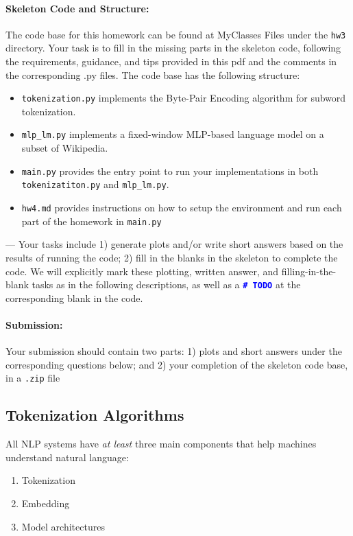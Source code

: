 \noindent \paragraph{Skeleton Code and Structure:}
The code base for this homework can be found at MyClasses Files under the \texttt{hw3} directory. Your task is to fill in the missing parts in the skeleton code, following the requirements, guidance, and tips provided in this pdf and the comments in the corresponding .py files.
The code base has the following structure:
\begin{itemize}
    \item \texttt{tokenization.py} implements the Byte-Pair Encoding algorithm for subword tokenization.
    \item \texttt{mlp\_lm.py} implements a fixed-window MLP-based language model on a subset of Wikipedia. 
    \item \texttt{main.py} provides the entry point to run your implementations in both \texttt{tokenizatiton.py} and \texttt{mlp\_lm.py}.
    \item \texttt{hw4.md} provides instructions on how to setup the environment and run each part of the homework in \texttt{main.py}
    
\end{itemize}

\noindent \todo{} ---
Your tasks include
1) generate plots and/or write short answers based on the results of running the code; 2) fill in the blanks in the skeleton to complete the code. We will explicitly mark these plotting, written answer, and filling-in-the-blank tasks as \todo{} in the following descriptions, as well as a \textcolor{blue}{\texttt{\textbf{\#~TODO}}} at the corresponding blank in the code. \\
\noindent \paragraph{Submission:} Your submission should contain two parts: 1) plots and short answers under the corresponding questions below; and 2) your completion of the skeleton code base, in a \texttt{.zip} file

\subsection{Tokenization Algorithms}
All NLP systems have \textit{at least} three main components that help machines understand natural language:
\begin{enumerate}
    \item Tokenization
    \item Embedding
    \item Model architectures
\end{enumerate}

